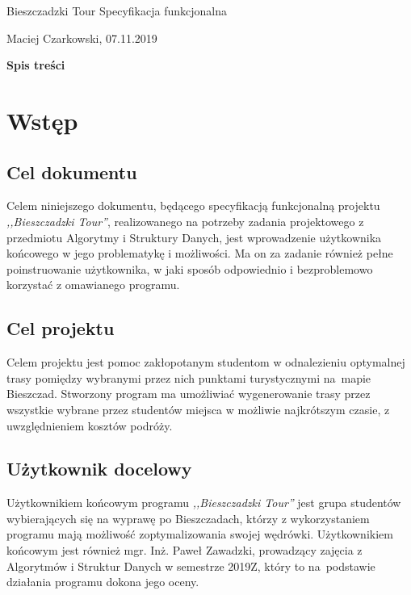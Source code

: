 \documentclass[12pt,a4paper]{article}
\begin{document}
\begin{titlepage}
\vspace*{\fill}
\begin{center}
{\fontsize{50}{0.1}\selectfont Bieszczadzki Tour}
\huge Specyfikacja funkcjonalna
\end{center}
\vspace*{\fill}
\begin{center}
Maciej Czarkowski, 07.11.2019
\end{center}
\end{titlepage}
\clearpage
\hspace{1cm}
\begin{center}
\LARGE\textbf{Spis treści}
\end{center}
\tableofcontents
\clearpage
\section{Wstęp}
\subsection{Cel dokumentu}
Celem niniejszego dokumentu, będącego specyfikacją funkcjonalną projektu \textsl{,,Bieszczadzki Tour''}, realizowanego na potrzeby zadania projektowego z przedmiotu Algorytmy i Struktury Danych, jest wprowadzenie użytkownika końcowego w jego problematykę i możliwości. Ma on za zadanie również pełne poinstruowanie użytkownika, w jaki sposób odpowiednio i bezproblemowo korzystać z omawianego programu.
\subsection{Cel projektu}
Celem projektu jest pomoc zakłopotanym studentom w odnalezieniu optymalnej trasy pomiędzy wybranymi przez nich punktami turystycznymi na~mapie Bieszczad. Stworzony program ma umożliwiać wygenerowanie trasy przez wszystkie wybrane przez studentów miejsca w możliwie najkrótszym czasie, z uwzględnieniem kosztów podróży.
\subsection{Użytkownik docelowy}
Użytkownikiem końcowym programu \textsl{,,Bieszczadzki Tour''} jest grupa studentów wybierających się na wyprawę po Bieszczadach, którzy z wykorzystaniem programu mają możliwość zoptymalizowania swojej wędrówki. Użytkownikiem końcowym jest również mgr. Inż. Paweł Zawadzki, prowadzący zajęcia z Algorytmów i Struktur Danych w semestrze 2019Z, który to na~podstawie działania programu dokona jego oceny.
\newpage
\end{document}
